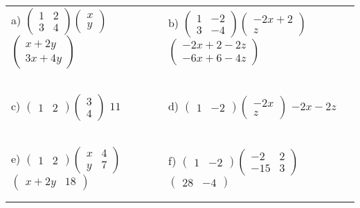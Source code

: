 \documentclass[fontsize=12pt]{scrartcl}
\begin{document}
\begin{tabular}{p{9cm}p{9cm}}
a) $\begin{pmatrix}1&2\\3&4 \end{pmatrix}\begin{pmatrix}x\\y \end{pmatrix}$
 \quad $\begin{pmatrix}x+2y\\3x+4y\end{pmatrix}$
&b) $\begin{pmatrix}1&-2\\3&-4 \end{pmatrix} \begin{pmatrix}-2x+2\\z \end{pmatrix}$
 \quad $\begin{pmatrix}-2x+2-2z\\-6x+6-4z \end{pmatrix}$
\\\\\\
\\\\\\

c) $\begin{pmatrix}1&2 \end{pmatrix}\begin{pmatrix}3\\4 \end{pmatrix}$
 \quad $11$
&d) $\begin{pmatrix}1&-2 \end{pmatrix} \begin{pmatrix}-2x\\z \end{pmatrix}$
 \quad $-2x-2z$
\\\\\\
\\\\\\

e) $\begin{pmatrix}1&2 \end{pmatrix}\begin{pmatrix}x&4\\y&7 \end{pmatrix}$
 \quad $\begin{pmatrix}x+2y&18\end{pmatrix}$
&f) $\begin{pmatrix}1&-2 \end{pmatrix} \begin{pmatrix}-2&2\\-15&3 \end{pmatrix}$
 \quad $\begin{pmatrix}28&-4 \end{pmatrix}$
\\\\\\
\end{tabular}
\end{document}
